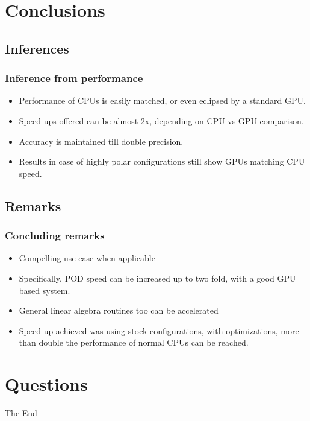 \documentclass{beamer}
\begin{document}
\section{Conclusions}
\subsection{Inferences}
\begin{frame}
\frametitle{Inference from performance}

\begin{itemize}
\item
Performance of CPUs is easily matched, or even eclipsed by a standard GPU.
\item
Speed-ups offered can be almost 2x, depending on CPU vs GPU comparison.
\item
Accuracy is maintained till double precision.
\item
Results in case of highly polar configurations still show GPUs matching CPU speed.
\end{itemize}
\end{frame}

\subsection{Remarks}
\begin{frame}
\frametitle{Concluding remarks}
\begin{itemize}
\item
Compelling use case when applicable
\item
Specifically, POD speed can be increased up to two fold, with a good GPU based system.
\item
General linear algebra routines too can be accelerated
\item
Speed up achieved was using stock configurations, with optimizations, more than double the performance of normal CPUs can be reached.
\end{itemize}
\end{frame}

\section*{Questions}


\begin{frame}
\Huge{\centerline{The End}}
\end{frame}

\end{document}
